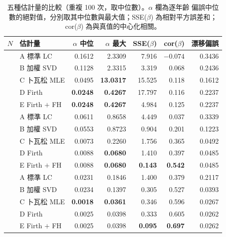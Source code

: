 \documentclass[UTF8, fontset=macnew, a4paper, 12pt]{ctexart}
\begin{document}
\begin{table}[H]
  \centering
  \caption{五種估計量的比較（重複 100 次，取中位數）。$\alpha$ 欄為逐年齡
  偏誤中位數的絕對值，分別取其中位數與最大值；SSE($\beta$) 為相對平方誤差和；
  cor($\beta$) 為與真值的中心化相關。}
  \label{tab:est}
  \small
  \begin{tabular}{llrrrrr}
    \toprule
    $N$ & 估計量 & $\alpha$ 中位 & $\alpha$ 最大 & SSE($\beta$) & cor($\beta$) & 漂移偏誤 \\
    \midrule
      & A 標準 LC        & 0.1612 & 2.3309 & 7.916 & $-0.074$ & 0.3436 \\
      & B 加權 SVD       & 0.1128 & 2.3315 & 3.319 & 0.068 & 0.2436 \\
      & C 卜瓦松 MLE     & 0.0495 & \textbf{13.0317} & 15.525 & 0.118 & 0.1612 \\
      & D Firth          & \textbf{0.0248} & \textbf{0.4267} & 17.797 & 0.116 & 0.2237 \\
      & E Firth $+$ FH   & \textbf{0.0248} & \textbf{0.4267} & 4.984 & 0.125 & 0.2237 \\
    \midrule
      & A 標準 LC        & 0.0611 & 0.8658 & 4.449 & 0.037 & 0.3339 \\
      & B 加權 SVD       & 0.0553 & 0.8723 & 0.904 & 0.201 & 0.1223 \\
      & C 卜瓦松 MLE     & 0.0073 & 0.2260 & 1.756 & 0.365 & 0.0492 \\
      & D Firth          & 0.0088 & \textbf{0.0680} & 1.410 & 0.397 & 0.0485 \\
      & E Firth $+$ FH   & 0.0088 & \textbf{0.0680} & \textbf{0.143} & \textbf{0.542} & 0.0485 \\
    \midrule
      & A 標準 LC        & 0.0231 & 0.1846 & 1.400 & 0.379 & 0.2117 \\
      & B 加權 SVD       & 0.0234 & 0.1397 & 0.305 & 0.527 & 0.0393 \\
      & C 卜瓦松 MLE     & \textbf{0.0018} & \textbf{0.0361} & 0.346 & 0.596 & 0.0267 \\
      & D Firth          & 0.0025 & 0.0398 & 0.333 & 0.605 & 0.0262 \\
      & E Firth $+$ FH   & 0.0025 & 0.0398 & \textbf{0.095} & \textbf{0.697} & 0.0262 \\
    \bottomrule
  \end{tabular}
\end{table}
\end{document}
